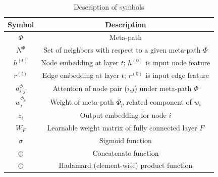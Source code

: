 \begin{table}[]
\caption{Description of symbols}
\centering
\begin{tabular}{cc}
\hline
Symbol       & Description                                                       \\ \hline
$\Phi$         & Meta-path                                                         \\
$N^\Phi$       & Set of neighbors with respect to a given meta-path $\Phi$          \\
$h^{(t)}$        & Node embedding at layer $t$; $h^{(0)}$ is input node feature \\
$r^{(t)}$        & Edge embedding at layer $t$; $r^{(0)}$ is input edge feature \\
$a_{i,j}^\Phi$ & Attention of node pair ($i$,$j$) under meta-path $\Phi$    \\
$w_i^{\Phi_p}$   &  Weight of meta-path $\Phi_p$  related component of $w_i$\\
$z_i$            & Output embedding for node $i$                                     \\
$W_F$          & Learnable weight matrix of fully connected layer $F$  \\
$\sigma$       & Sigmoid function                                                  \\
$\oplus$       & Concatenate function \\
$\odot$       & Hadamard (element-wise) product function \\
\hline
\end{tabular}
\label{table:notation}
\end{table}











